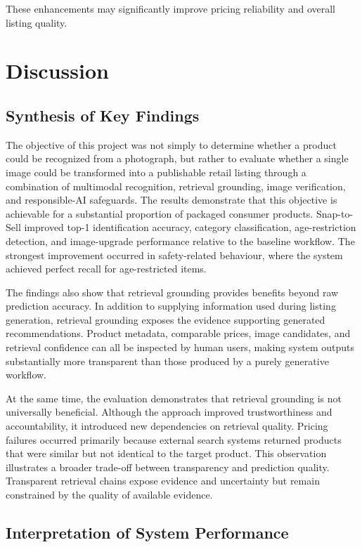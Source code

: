 \documentclass[conference]{IEEEtran}
\begin{document}
These enhancements may significantly improve pricing reliability and overall listing quality.

\section{Discussion}

\subsection{Synthesis of Key Findings}

The objective of this project was not simply to determine whether a product
could be recognized from a photograph, but rather to evaluate whether a
single image could be transformed into a publishable retail listing through
a combination of multimodal recognition, retrieval grounding, image
verification, and responsible-AI safeguards. The results demonstrate that
this objective is achievable for a substantial proportion of packaged
consumer products. Snap-to-Sell improved top-1 identification accuracy,
category classification, age-restriction detection, and image-upgrade
performance relative to the baseline workflow. The strongest improvement
occurred in safety-related behaviour, where the system achieved perfect
recall for age-restricted items. 

The findings also show that retrieval grounding provides benefits beyond
raw prediction accuracy. In addition to supplying information used during
listing generation, retrieval grounding exposes the evidence supporting
generated recommendations. Product metadata, comparable prices, image
candidates, and retrieval confidence can all be inspected by human users,
making system outputs substantially more transparent than those produced by
a purely generative workflow. 

At the same time, the evaluation demonstrates that retrieval grounding is
not universally beneficial. Although the approach improved trustworthiness
and accountability, it introduced new dependencies on retrieval quality.
Pricing failures occurred primarily because external search systems returned
products that were similar but not identical to the target product. This
observation illustrates a broader trade-off between transparency and
prediction quality. Transparent retrieval chains expose evidence and
uncertainty but remain constrained by the quality of available evidence. 

\subsection{Interpretation of System Performance}
\end{document}
